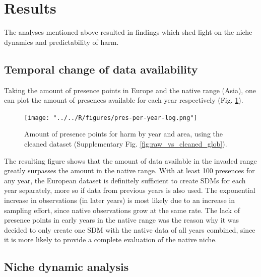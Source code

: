 \documentclass[12pt,a4paper]{article}
\begin{document}
\newpage
\section{Results} \label{sec:results}
The analyses mentioned above resulted in findings which shed light on the niche dynamics and predictability of \gls{harm}.

\subsection{Temporal change of data availability} \label{ssec:temp_data_change}
Taking the amount of presence points in Europe and the native range (Asia), one can plot the amount of presences available for each year respectively (Fig. \ref{fig:pres_per_year_log}).

\begin{figure}[!h]
    \centering
    \texttt{[image: "../../R/figures/pres-per-year-log.png"]}
    \caption{\label{fig:pres_per_year_log} Amount of presence points for \gls{harm} by year and area, using the cleaned dataset (Supplementary Fig. \ref{fig:raw_vs_cleaned_glob}).}
\end{figure}

The resulting figure shows that the amount of data available in the invaded range greatly surpasses the amount in the native range.
With at least 100 presences for any year, the European dataset is definitely sufficient to create SDMs for each year separately, more so if data from previous years is also used.
The exponential increase in observations (in later years) is most likely due to an increase in sampling effort, since native observations grow at the same rate.
The lack of presence points in early years in the native range was the reason why it was decided to only create one SDM with the native data of all years combined, since it is more likely to provide a complete evaluation of the native niche.

\subsection{Niche dynamic analysis} \label{ssec:niche_dyn_analysis}
\end{document}
